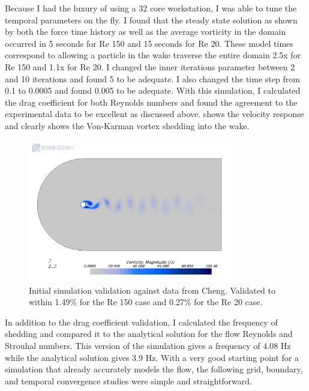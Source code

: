\documentclass[10pt,english]{article}
\begin{document}
 Because I had the luxury of using a 32 core workstation, I was able to tune the temporal parameters on the fly.  I found that the steady state solution as shown by both the force time history as well as the average vorticity in the domain occurred in 5 seconds for Re 150 and 15 seconds for Re 20.  These model times correspond to allowing a particle in the wake traverse the entire domain 2.5x for Re 150 and 1.1x for Re 20.  I changed the inner iterations parameter between 2 and 10 iterations and found 5 to be adequate.  I also changed the time step from 0.1 to 0.0005 and found 0.005 to be adequate.  With this simulation, I calculated the drag coefficient for both Reynolds numbers and found the agreement to the experimental data to be excellent as discussed above.   shows the velocity response and clearly shows the Von-Karman vortex shedding into the wake. 
 
 \begin{figure}[h]
\centering
\includegraphics[trim={1.5cm 0cm 1.0cm 3cm},clip,width=0.8\textwidth]{cylinder_2_05_ScalarScene2_Re150.png}
\vspace{-5pt}
\caption{Initial simulation validation against data from Cheng. Validated to within 1.49\% for the Re 150 case and 0.27\% for the Re 20 case. }
\label{f:scalar05_1}
\end{figure}

In addition to the drag coefficient validation, I calculated the frequency of shedding and compared it to the analytical solution for the flow Reynolds and Strouhal numbers.  This version of the simulation gives a frequency of 4.08 Hz while the analytical solution gives 3.9 Hz.  With a very good starting point for a simulation that already accurately models the flow, the following grid, boundary, and temporal convergence studies were simple and straightforward.
\end{document}
